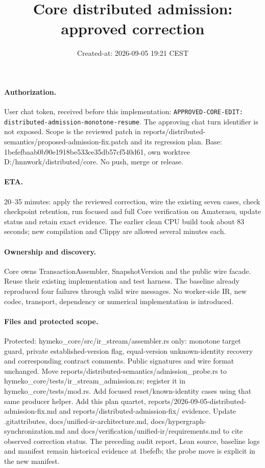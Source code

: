 \documentclass[11pt,a4paper]{article}
\title{Core distributed admission: approved correction}
\date{Created-at: 2026-09-05 19:21 CEST}
\begin{document}
\maketitle
\paragraph{Authorization.}
User chat token, received before this implementation:
\texttt{APPROVED-CORE-EDIT: distributed-admission-monotone-resume}.
The approving chat turn identifier is not exposed. Scope is the reviewed patch
in reports/distributed-semantics/proposed-admission-fix.patch and its regression
plan. Base: 1befefbaab0b90e1918be533ce35db57cf540d61, own worktree
D:/hnnwork/distributed/core. No push, merge or release.
\paragraph{ETA.}
20--35 minutes: apply the reviewed correction, wire the existing seven cases,
check checkpoint retention, run focused and full Core verification on Amaterasu,
update status and retain exact evidence. The earlier clean CPU build took about
83 seconds; new compilation and Clippy are allowed several minutes each.
\paragraph{Ownership and discovery.}
Core owns TransactionAssembler, SnapshotVersion and the public wire facade.
Reuse their existing implementation and test harness. The baseline already
reproduced four failures through valid wire messages. No worker-side IR, new
codec, transport, dependency or numerical implementation is introduced.
\paragraph{Files and protected scope.}
Protected: hymeko\_core/src/ir\_stream/assembler.rs only: monotone target guard,
private established-version flag, equal-version unknown-identity recovery and
corresponding contract comments. Public signatures and wire format unchanged.
Move reports/distributed-semantics/admission\_probe.rs to
hymeko\_core/tests/ir\_stream\_admission.rs; register it in
hymeko\_core/tests/mod.rs. Add focused reset/known-identity cases using that same
producer helper. Add this plan quartet, reports/2026-09-05-distributed-admission-fix.md
and reports/distributed-admission-fix/ evidence. Update .gitattributes,
docs/unified-ir-architecture.md, docs/hypergraph-synchronization.md and
docs/verification/unified-ir/requirements.md to cite observed correction status.
The preceding audit report, Lean source, baseline logs and manifest remain
historical evidence at 1befefb; the probe move is explicit in the new manifest.
\end{document}
